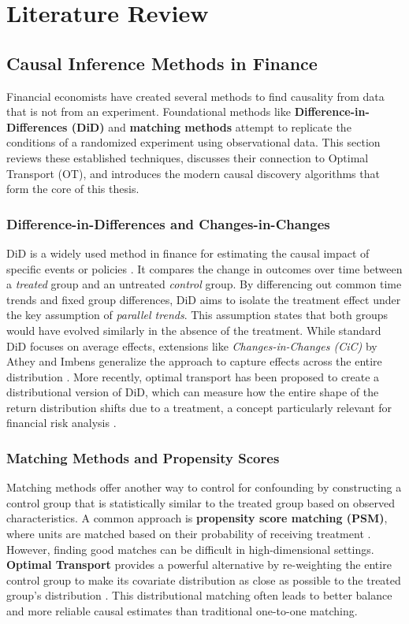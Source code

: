 \chapter{Literature Review}
\label{ch:literature}

\section{Causal Inference Methods in Finance}
Financial economists have created several methods to find causality from data that is not from an experiment. Foundational methods like \textbf{Difference-in-Differences (DiD)} and \textbf{matching methods} attempt to replicate the conditions of a randomized experiment using observational data. This section reviews these established techniques, discusses their connection to Optimal Transport (OT), and introduces the modern causal discovery algorithms that form the core of this thesis.

\subsection*{Difference-in-Differences and Changes-in-Changes}
DiD is a widely used method in finance for estimating the causal impact of specific events or policies \cite{Athey16}. It compares the change in outcomes over time between a \textit{treated} group and an untreated \textit{control} group. By differencing out common time trends and fixed group differences, DiD aims to isolate the treatment effect under the key assumption of \textit{parallel trends}. This assumption states that both groups would have evolved similarly in the absence of the treatment. While standard DiD focuses on average effects, extensions like \textit{Changes-in-Changes (CiC)} by Athey and Imbens generalize the approach to capture effects across the entire distribution \cite{Athey06}. More recently, optimal transport has been proposed to create a distributional version of DiD, which can measure how the entire shape of the return distribution shifts due to a treatment, a concept particularly relevant for financial risk analysis \cite{Torous24}.

\subsection*{Matching Methods and Propensity Scores}
Matching methods offer another way to control for confounding by constructing a control group that is statistically similar to the treated group based on observed characteristics. A common approach is \textbf{propensity score matching (PSM)}, where units are matched based on their probability of receiving treatment \cite{Rosenbaum83}. However, finding good matches can be difficult in high-dimensional settings. \textbf{Optimal Transport} provides a powerful alternative by re-weighting the entire control group to make its covariate distribution as close as possible to the treated group's distribution \cite{Torous24}. This distributional matching often leads to better balance and more reliable causal estimates than traditional one-to-one matching.

